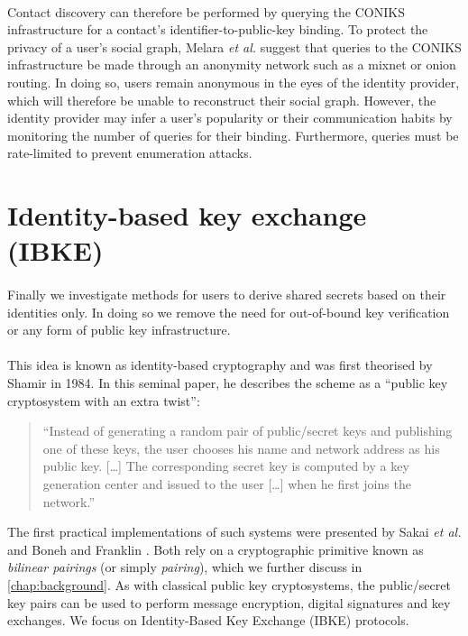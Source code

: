 \paragraph{}  Contact discovery can therefore be performed by querying the CONIKS infrastructure for a contact's identifier-to-public-key binding. To protect the privacy of a user's social graph, Melara \textit{et al.} \cite{Melara2014} suggest that queries to the CONIKS infrastructure be made through an anonymity network such as a mixnet or onion routing. In doing so, users remain anonymous in the eyes of the identity provider, which will therefore be unable to reconstruct their social graph. However, the identity provider may infer a user's popularity or their communication habits by monitoring the number of queries for their binding. Furthermore, queries must be rate-limited to prevent enumeration attacks.


\section{Identity-based key exchange (IBKE)}
\label{sec:IBKE}


\paragraph{} Finally we investigate methods for users to derive shared secrets based on their identities only. In doing so we remove the need for out-of-bound key verification or any form of public key infrastructure. 

\paragraph{} This idea is known as identity-based cryptography and was first theorised by Shamir \cite{Shamir1985} in 1984. In this seminal paper, he describes the scheme as a ``public key cryptosystem with an extra twist'':
\begin{quote}
	``Instead of generating a random pair of public/secret keys and publishing one of these keys, the user chooses his name and network address as his public key. [\dots] The corresponding secret key is computed by a key generation center and issued to the user [\dots] when he first joins the network.'' \cite{Shamir1985}
\end{quote}

\noindent The first practical implementations of such systems were presented by Sakai \textit{et al.} \cite{Sakai2000} and Boneh and Franklin \cite{Boneh2001}. Both rely on a cryptographic primitive known as \textit{bilinear pairings} (or simply \textit{pairing}), which we further discuss in \autoref{chap:background}. As with classical public key cryptosystems, the public/secret key pairs can be used to perform message encryption, digital signatures and key exchanges. We focus on Identity-Based Key Exchange (IBKE) protocols.


